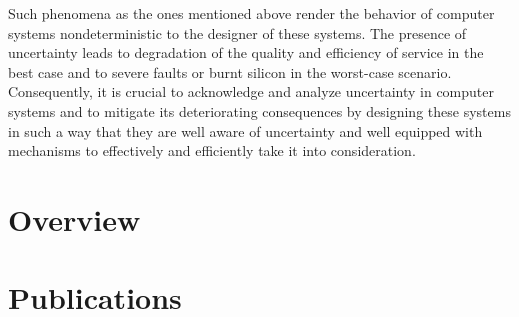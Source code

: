 Such phenomena as the ones mentioned above render the behavior of computer
systems nondeterministic to the designer of these systems. The presence of
uncertainty leads to degradation of the quality and efficiency of service in the
best case and to severe faults or burnt silicon in the worst-case scenario.
Consequently, it is crucial to acknowledge and analyze uncertainty in computer
systems and to mitigate its deteriorating consequences by designing these
systems in such a way that they are well aware of uncertainty and well equipped
with mechanisms to effectively and efficiently take it into consideration.

\section{Overview}

\section{Publications}
